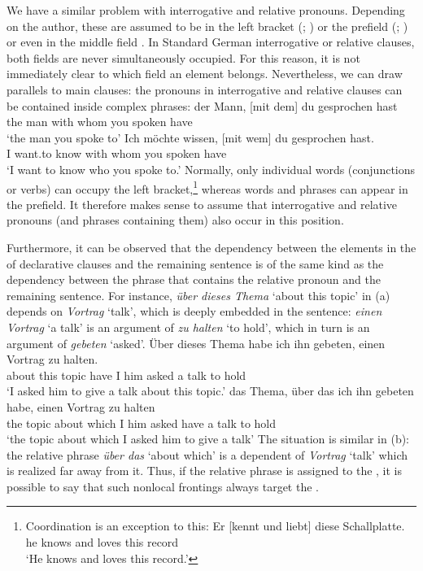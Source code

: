 We have a similar problem with interrogative and
relative pronouns. Depending on the author, these are assumed to be in the left bracket
(\citealp{Kathol2001a}; \citealp[]{Eisenberg2004a}) or the prefield
(\citealp[§1345]{Duden2005-Authors}; \citealp[--30, Section~3.1]{Woellstein2010a-u}) or even
in the middle field \citep[]{AH2004a-u}. In Standard German interrogative or relative
clauses, both fields are never simultaneously
occupied. For this reason, it is not immediately clear to which field an element
belongs. Nevertheless, we can draw parallels to main clauses: the pronouns in  interrogative and
relative clauses can be contained inside complex phrases: 
\eal
\ex 
\gll der Mann,         [mit dem] du gesprochen hast\\
     the man \spacebr{}with whom you spoken have\\
\glt `the man you spoke to'	 
\ex 
\gll Ich möchte wissen, [mit wem] du gesprochen hast.\\
     I want.to know \spacebr{}with whom you spoken have\\
\glt `I want to know who you spoke to.'
\zl
Normally, only individual words (conjunctions or verbs) can occupy the left bracket,\footnote{
 Coordination is an exception to this:
\ea
\gll Er [kennt und liebt] diese Schallplatte.\\
     he \spacebr{}knows and loves this record\\
\glt `He knows and loves this record.'
\z
} 
whereas words and phrases can appear in the prefield. It therefore makes sense to assume that interrogative and relative pronouns (and phrases containing them)
also occur in this position. 

Furthermore, it can be observed that the dependency between the elements in the \vf of declarative
clauses and the remaining sentence is of the same kind as the dependency between the phrase that
contains the relative pronoun and the remaining sentence. For instance, \emph{über dieses Thema}
`about this topic' in (a)
depends on \emph{Vortrag} `talk', which is deeply embedded in the sentence:
\emph{einen Vortrag} `a talk' is an argument of \emph{zu halten} `to hold', which in turn is an
argument of \emph{gebeten} `asked'.
\eal
\ex 
\gll Über dieses Thema habe ich ihn gebeten, einen Vortrag zu halten.\\
     about this topic  have I   him asked    a     talk    to hold\\
\glt `I asked him to give a talk about this topic.'
\ex 
\gll das Thema, über das ich ihn gebeten habe, einen Vortrag zu halten\\
     the topic  about which I him asked have a talk to hold\\
\glt `the topic about which I asked him to give a talk'
\zl
The situation is similar in (b): the relative phrase \emph{über das} `about which' is a dependent of
\emph{Vortrag} `talk' which is realized far away from it. Thus, if the relative phrase is assigned to the \vf, it is
possible to say that such nonlocal frontings always target the \vf.

